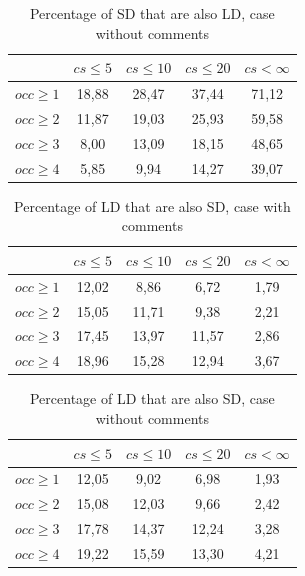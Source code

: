 \documentclass[12pt]{mitthesis}
\begin{document}
\begin{table}[!h]
\renewcommand{\arraystretch}{1}
\caption{Percentage of SD that are also LD, case without comments}
\label{tab:percSD:nocomm}
\centering

\begin{tabular}{|c|c|c|c|c|}
\hline
	      &	$cs\leq 5$	&	$cs\leq 10$	&	$cs\leq 20$	&	$cs< \infty$	\\
\hline
$occ\geq 1$	&	18,88	&	28,47	&	37,44	&	71,12	\\
$occ\geq 2$	&	11,87	&	19,03	&	25,93	&	59,58	\\
$occ\geq 3$	&	8,00	&	13,09	&	18,15	&	48,65	\\
$occ\geq 4$	&	5,85	&	9,94	&	14,27	&	39,07	\\
\hline
\end{tabular}
\end{table}

\begin{table}[!h]
\renewcommand{\arraystretch}{1}
\caption{Percentage of LD that are also SD, case with comments}
\label{tab:percLD:comm}
\centering

\begin{tabular}{|c|c|c|c|c|}
\hline
	      &	$cs\leq 5$	&	$cs\leq 10$	&	$cs\leq 20$	&	$cs< \infty$	\\
\hline
$occ\geq 1$	&	12,02	&	8,86	&	6,72	&	1,79	\\
$occ\geq 2$	&	15,05	&	11,71	&	9,38	&	2,21	\\
$occ\geq 3$	&	17,45	&	13,97	&	11,57	&	2,86	\\
$occ\geq 4$	&	18,96	&	15,28	&	12,94	&	3,67	\\
\hline
\end{tabular}
\end{table}

\begin{table}[!h]
\renewcommand{\arraystretch}{1}
\caption{Percentage of LD that are also SD, case without comments}
\label{tab:percLD:nocomm}
\centering
\begin{tabular}{|c|c|c|c|c|}
\hline
	      &	$cs\leq 5$	&	$cs\leq 10$	&	$cs\leq 20$	&	$cs< \infty$	\\
\hline
$occ\geq 1$	&	12,05	&	9,02	&	6,98	&	1,93	\\
$occ\geq 2$	&	15,08	&	12,03	&	9,66	&	2,42	\\
$occ\geq 3$	&	17,78	&	14,37	&	12,24	&	3,28	\\
$occ\geq 4$	&	19,22	&	15,59	&	13,30	&	4,21	\\
\hline
\end{tabular}
\end{table}
\end{document}
